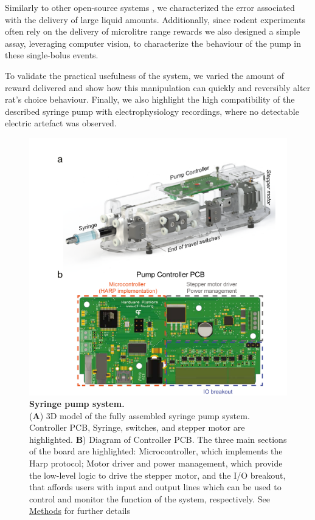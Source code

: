 Similarly to other open-source systems \citep{Wijnen2014, Amarante2019}, we characterized the error associated with the delivery of large liquid amounts. Additionally, since rodent experiments often rely on the delivery of microlitre range rewards we also designed a simple assay, leveraging computer vision, to characterize the behaviour of the pump in these single-bolus events.

To validate the practical usefulness of the system, we varied the amount of reward delivered and show how this manipulation can quickly and reversibly alter rat's choice behaviour. Finally, we also highlight the high compatibility of the described syringe pump with electrophysiology recordings, where no detectable electric artefact was observed.


\begin{figure}
	\centering
	\includegraphics[width=1.0\linewidth]{Figures/Artboard 1.pdf}
	\caption{\textbf{Syringe pump system.}\\
		(\textbf{A}) 3D model of the fully assembled syringe pump system. Controller PCB, Syringe, switches, and stepper motor are highlighted.  \textbf{B}) Diagram of Controller PCB. The three main sections of the board are highlighted: Microcontroller, which implements the Harp protocol; Motor driver and power management, which provide the low-level logic to drive the stepper motor, and the I/O breakout, that affords users with input and output lines which can be used to control and monitor the function of the system, respectively. See \hyperref[s:methods]{Methods} for further details}
	\label{fig:PumpDrawing}
\end{figure}
